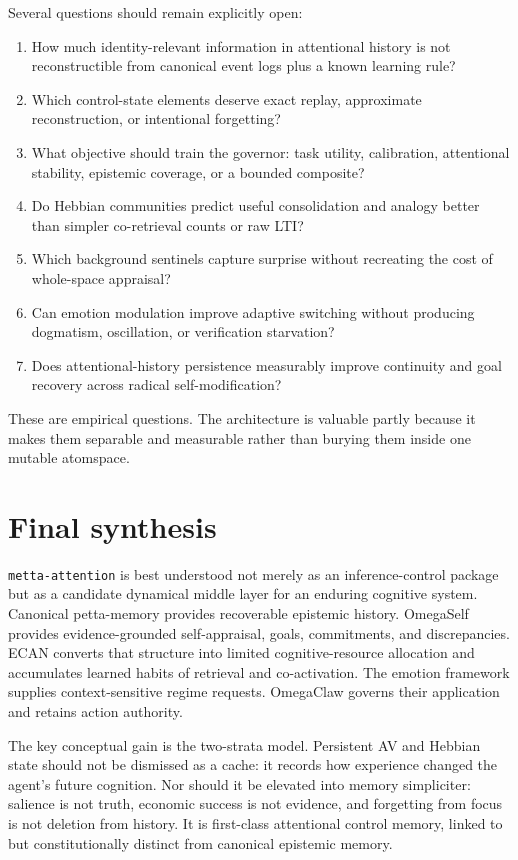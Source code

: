 \documentclass[11pt]{article}
\newcommand{\code}[1]{\texttt{#1}}
\begin{document}
Several questions should remain explicitly open:
\begin{enumerate}
  \item How much identity-relevant information in attentional history is not
  reconstructible from canonical event logs plus a known learning rule?
  \item Which control-state elements deserve exact replay, approximate
  reconstruction, or intentional forgetting?
  \item What objective should train the governor: task utility, calibration,
  attentional stability, epistemic coverage, or a bounded composite?
  \item Do Hebbian communities predict useful consolidation and analogy better
  than simpler co-retrieval counts or raw LTI?
  \item Which background sentinels capture surprise without recreating the cost
  of whole-space appraisal?
  \item Can emotion modulation improve adaptive switching without producing
  dogmatism, oscillation, or verification starvation?
  \item Does attentional-history persistence measurably improve continuity and
  goal recovery across radical self-modification?
\end{enumerate}

These are empirical questions.  The architecture is valuable partly because it
makes them separable and measurable rather than burying them inside one mutable
atomspace.

\section{Final synthesis}

\code{metta-attention} is best understood not merely as an inference-control
package but as a candidate dynamical middle layer for an enduring cognitive
system.  Canonical petta-memory provides recoverable epistemic history.
OmegaSelf provides evidence-grounded self-appraisal, goals, commitments, and
discrepancies.  ECAN converts that structure into limited cognitive-resource
allocation and accumulates learned habits of retrieval and co-activation.
The emotion framework supplies context-sensitive regime requests.  OmegaClaw
governs their application and retains action authority.

The key conceptual gain is the two-strata model.  Persistent AV and Hebbian
state should not be dismissed as a cache: it records how experience changed
the agent's future cognition.  Nor should it be elevated into memory
simpliciter: salience is not truth, economic success is not evidence, and
forgetting from focus is not deletion from history.  It is first-class
attentional control memory, linked to but constitutionally distinct from
canonical epistemic memory.
\end{document}
